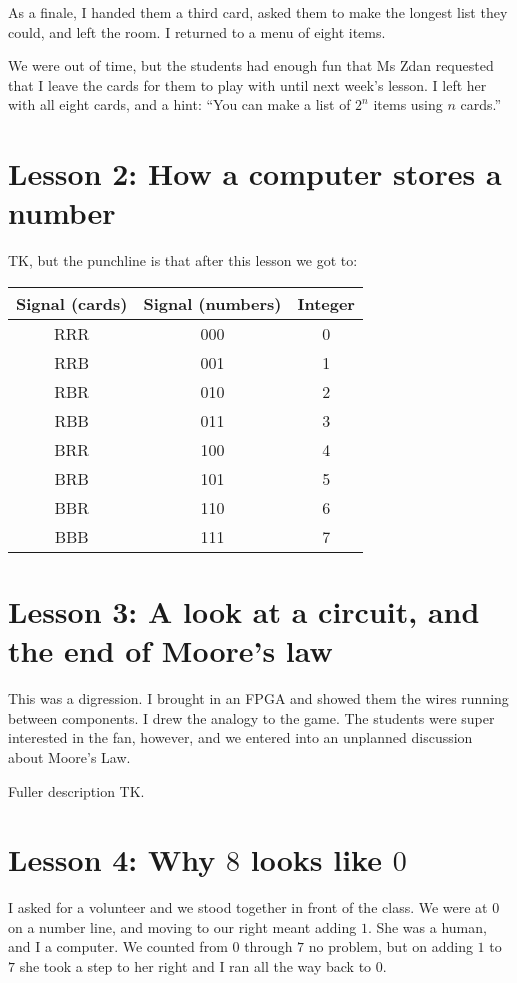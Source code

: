 \documentclass[sigplan,review]{acmart}
\begin{document}
As a finale, I handed them a third card, asked them to make the longest list they could, and left the room.
I returned to a menu of eight items.

We were out of time, but the students had enough fun that Ms Zdan requested that I leave the cards for them to play with until next week's lesson.
I left her with all eight cards, and a hint: ``You can make a list of $2^n$ items using $n$ cards.''


\section*{Lesson 2: How a computer stores a number}

TK, but the punchline is that after this lesson we got to:

\begin{table}[h]\sffamily
  \begin{tabular}{ccc}
  Signal (cards) & Signal (numbers) & Integer \\
  \midrule
  RRR & 000 & 0 \\
  RRB & 001 & 1 \\
  RBR & 010 & 2 \\
  RBB & 011 & 3 \\
  BRR & 100 & 4 \\
  BRB & 101 & 5 \\
  BBR & 110 & 6 \\
  BBB & 111 & 7 \\
  \end{tabular}
\end{table}

\section*{Lesson 3: A look at a circuit, and the end of Moore's law}

This was a digression.
I brought in an FPGA and showed them the wires running between components.
I drew the analogy to the game.
The students were super interested in the fan, however, and we entered into an unplanned discussion about Moore's Law.

Fuller description TK.

\section*{Lesson 4: Why $8$ looks like $0$}

I asked for a volunteer and we stood together in front of the class.
We were at $0$ on a number line, and moving to our right meant adding $1$.
She was a human, and I a computer.
We counted from $0$ through $7$ no problem, but on adding $1$ to $7$ she took a step to her right and I ran all the way back to $0$.
\end{document}
